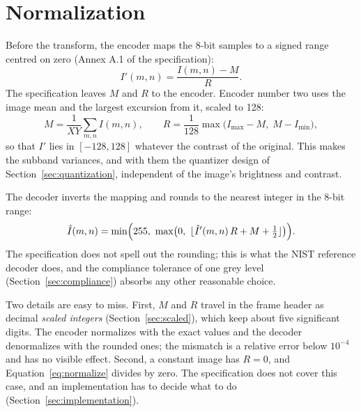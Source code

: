 \section{Normalization}
\label{sec:normalization}

Before the transform, the encoder maps the 8-bit samples to a signed range centred on zero
(Annex A.1 of the specification):
\begin{equation}
  I'(m,n) = \frac{I(m,n) - M}{R}.
  \label{eq:normalize}
\end{equation}
The specification leaves $M$ and $R$ to the encoder. Encoder number two uses the image mean
and the largest excursion from it, scaled to 128:
\begin{equation}
  M = \frac{1}{XY}\sum_{m,n} I(m,n), \qquad
  R = \frac{1}{128}\max\bigl(I_{\max} - M,\; M - I_{\min}\bigr),
  \label{eq:MR}
\end{equation}
so that $I'$ lies in $[-128, 128]$ whatever the contrast of the original. This makes the
subband variances, and with them the quantizer design of Section~\ref{sec:quantization},
independent of the image's brightness and contrast.

The decoder inverts the mapping and rounds to the nearest integer in the 8-bit range:
\begin{equation}
  \hat I(m,n) = \min\Bigl(255,\ \max\bigl(0,\ \lfloor \hat I'(m,n)\,R + M + \tfrac12 \rfloor\bigr)\Bigr).
  \label{eq:denormalize}
\end{equation}
The specification does not spell out the rounding; this is what the NIST reference decoder
does, and the compliance tolerance of one grey level (Section~\ref{sec:compliance}) absorbs
any other reasonable choice.

Two details are easy to miss. First, $M$ and $R$ travel in the frame header as decimal
\emph{scaled integers} (Section~\ref{sec:scaled}), which keep about five significant digits.
The encoder normalizes with the exact values and the decoder denormalizes with the rounded
ones; the mismatch is a relative error below $10^{-4}$ and has no visible effect. Second,
a constant image has $R = 0$, and Equation~\eqref{eq:normalize} divides by zero. The
specification does not cover this case, and an implementation has to decide what to do
(Section~\ref{sec:implementation}).
